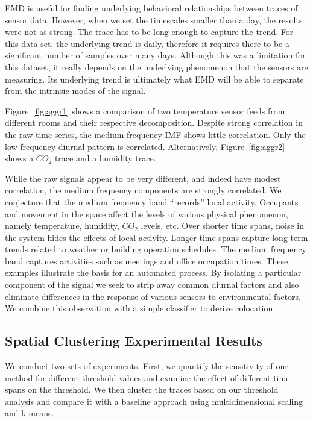 EMD is useful for finding underlying behavioral relationships between traces of sensor data.  However,
when we set the timescales smaller than a day, the results were not as strong.
The trace has to be long enough to capture the trend.  For this data set, the underlying
trend is daily, therefore it requires there to be a significant number of samples over many days.
Although this was a limitation for this dataset, it really depends on the underlying phenomenon that
the sensors are measuring.  Its underlying trend is ultimately what EMD will be able to separate
from the intrinsic modes of the signal.


Figure~\ref{fig:aggr1} shows a comparison of two temperature sensor feeds from different rooms and their respective
decomposition.  Despite strong correlation in the raw time series, the medium frequency IMF shows little correlation.
Only the low frequency diurnal pattern is correlated.  Alternatively,  Figure~\ref{fig:aggr2} shows a $CO_{2}$ trace and a humidity trace.

While the raw signals appear to be very different, and indeed have modest correlation, the medium frequency components
are strongly correlated.  We conjecture that the medium frequency band ``records'' local activity.  Occupants
and movement in the space affect the levels of various physical phenomenon, namely temperature, humidity, $CO_{2}$ levels, etc.
Over shorter time spans, noise in the system hides the effects of local activity.  Longer time-spans capture long-term trends 
related to weather or building operation schedules.  The medium frequency band
captures activities such as meetings and office occupation times.  
These examples illustrate the basis for an automated process.  By isolating a particular component of the signal
we seek to strip away common diurnal factors and also eliminate differences in the response of various sensors to environmental factors.
We combine this observation with a simple classifier to derive colocation.






\subsection{Spatial Clustering Experimental Results}
We conduct two sets of experiments. First, we quantify the sensitivity of our method for different threshold values 
and examine the effect of different time spans on the threshold. We then cluster the traces based on our threshold analysis 
and compare it with a baseline approach using multidimensional scaling and k-means.


